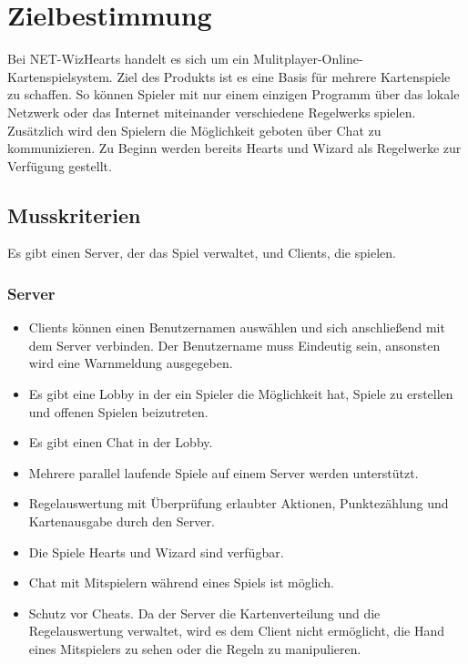 \documentclass{article}
\begin{document}
\tableofcontents
\newpage

\section{Zielbestimmung}
Bei NET-WizHearts handelt es sich um ein Mulitplayer-Online-Kartenspielsystem. Ziel des Produkts ist es eine Basis für mehrere Kartenspiele zu schaffen. So können Spieler mit nur einem einzigen Programm über das lokale Netzwerk oder das Internet miteinander verschiedene \glspl{Regelwerk} spielen. Zusätzlich wird den Spielern die Möglichkeit geboten über Chat zu kommunizieren. Zu Beginn werden bereits Hearts und Wizard als Regelwerke zur Verfügung gestellt.

\subsection{Musskriterien}
Es gibt einen \gls{Server}, der das Spiel verwaltet, und \glspl{Client}, die spielen.
\subsubsection{\gls{Server}}
\begin{itemize}
	\item \glspl{Client} können einen Benutzernamen auswählen und sich anschließend mit dem Server verbinden.
		Der Benutzername muss Eindeutig sein, ansonsten wird eine Warnmeldung ausgegeben.
	\item Es gibt eine \gls{Lobby} in der ein Spieler die Möglichkeit hat, Spiele zu erstellen und offenen Spielen beizutreten.
	\item Es gibt einen Chat in der \gls{Lobby}.
	\item Mehrere parallel laufende Spiele auf einem Server werden unterstützt.
	\item Regelauswertung mit Überprüfung erlaubter Aktionen, Punktezählung und  Kartenausgabe durch den Server.
	\item Die Spiele Hearts und Wizard sind verfügbar.	
	\item Chat mit Mitspielern während eines Spiels ist möglich.
	\item Schutz vor Cheats. Da der Server die Kartenverteilung und die Regelauswertung verwaltet, wird es dem Client nicht ermöglicht, die Hand eines Mitspielers zu sehen oder die Regeln zu manipulieren.
\end{itemize}
\end{document}
